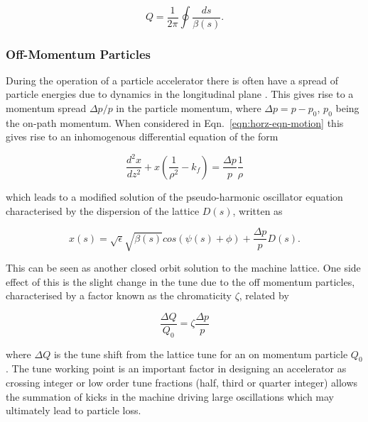 \begin{equation}
Q = \frac{1}{2\pi} \oint \frac{ds}{\beta \left( s \right)}.
\end{equation}

\subsubsection{Off-Momentum Particles}

During the operation of a particle accelerator there is often have a spread of particle energies due to dynamics in the longitudinal plane \cite{Leduff:LongDyn}. This gives rise to a momentum spread $\Delta p/p$ in the particle momentum, where $\Delta p = p - p_{0}$, $p_{0}$ being the on-path momentum. When considered in Eqn.~\ref{eqn:horz-eqn-motion} this gives rise to an inhomogenous differential equation of the form

\begin{equation}
\frac{d^{2}x}{dz^{2}} + x \left( \frac{1}{\rho^{2}} - k_{f}\right)  = \frac{\Delta p}{p}\frac{1}{\rho}
\label{eqn:disp-eqn-motion}
\end{equation}

which leads to a modified solution of the pseudo-harmonic oscillator equation characterised by the dispersion of the lattice $D(s)$, written as

\begin{equation}
x \left( s \right) = \sqrt{\epsilon} \sqrt{\beta \left( s \right) } cos \left( \psi \left( s \right) + \phi \right) + \frac{\Delta p}{p} D \left( s \right).
\end{equation}

This can be seen as another closed orbit solution to the machine lattice. One side effect of this is the slight change in the tune due to the off momentum particles, characterised by a factor known as the chromaticity $\zeta$, related by

\begin{equation}
\frac{\Delta Q}{Q_{0}} = \zeta \frac{\Delta p}{p}
\end{equation}

where $\Delta Q$ is the tune shift from the lattice tune for an on momentum particle $Q_{0}$. The tune working point is an important factor in designing an accelerator as crossing integer or low order tune fractions (half, third or quarter integer) allows the summation of kicks in the machine driving large oscillations which may ultimately lead to particle loss. 
